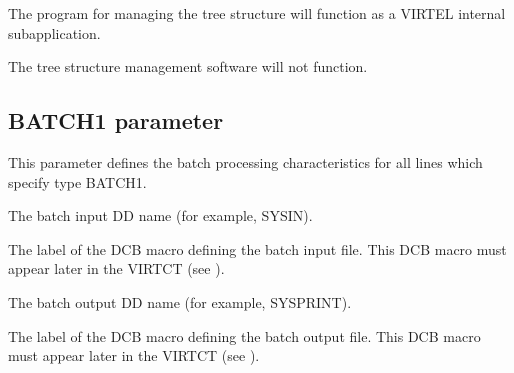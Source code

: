 \documentclass[letterpaper,10pt,english]{sphinxmanual}
\begin{document}
\sphinxAtStartPar
{} \sphinxhyphen{} The program for managing the tree structure will function as a VIRTEL internal sub\sphinxhyphen{}application.

\sphinxAtStartPar
{} \sphinxhyphen{} The tree structure management software will not function.

\ignorespaces 

\subsection{BATCH1 parameter}
\label{\detokenize{Installation_Guide:batch1-parameter}}\label{\detokenize{Installation_Guide:index-38}}
\begin{sphinxVerbatim}[commandchars=\\\{\}]
   
\end{sphinxVerbatim}

\sphinxAtStartPar
This parameter defines the batch processing characteristics for all lines which specify type BATCH1.

\sphinxAtStartPar
{} \sphinxhyphen{} The batch input DD name (for example, SYSIN).

\sphinxAtStartPar
{} \sphinxhyphen{} The label of the DCB macro defining the batch input file. This DCB macro must appear later in the VIRTCT (see {\hyperref[\detokenize{Installation_Guide:vvrrig-bookmark72}]{}}).

\sphinxAtStartPar
{} \sphinxhyphen{} The batch output DD name (for example, SYSPRINT).

\sphinxAtStartPar
{} \sphinxhyphen{} The label of the DCB macro defining the batch output file. This DCB macro must appear later in the VIRTCT (see {\hyperref[\detokenize{Installation_Guide:vvrrig-bookmark72}]{}}).

\ignorespaces 
\end{document}
